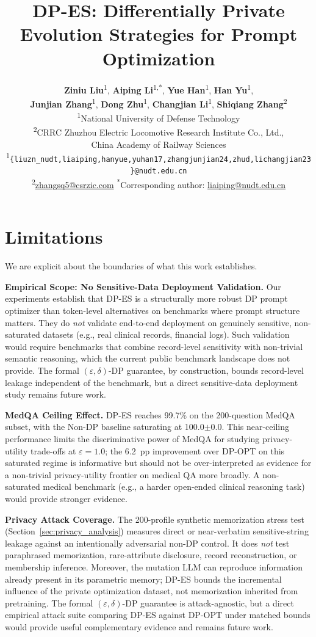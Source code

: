 \documentclass[11pt]{article}
\title{DP-ES: Differentially Private Evolution Strategies for Prompt Optimization}
\author{
\textbf{Ziniu Liu}\textsuperscript{1},
\textbf{Aiping Li}\textsuperscript{1,*},
\textbf{Yue Han}\textsuperscript{1},
\textbf{Han Yu}\textsuperscript{1},\\
\textbf{Junjian Zhang}\textsuperscript{1},
\textbf{Dong Zhu}\textsuperscript{1},
\textbf{Changjian Li}\textsuperscript{1},
\textbf{Shiqiang Zhang}\textsuperscript{2}\\
\textsuperscript{1}National University of Defense Technology\\
\textsuperscript{2}CRRC Zhuzhou Electric Locomotive Research Institute Co., Ltd.,\\
China Academy of Railway Sciences\\
{\small\textsuperscript{1}\texttt{\{liuzn\_nudt,liaiping,hanyue,yuhan17,zhangjunjian24,zhud,lichangjian23\}@nudt.edu.cn}}\\[-0.2em]
{\small\textsuperscript{2}\href{mailto:zhangsq5@csrzic.com}{zhangsq5@csrzic.com}\quad
\textsuperscript{*}Corresponding author: \href{mailto:liaiping@nudt.edu.cn}{liaiping@nudt.edu.cn}}
}
\begin{document}
\maketitle

















\section*{Limitations}

We are explicit about the boundaries of what this work establishes.

\noindent \textbf{Empirical Scope: No Sensitive-Data Deployment Validation.}
Our experiments establish that DP-ES is a structurally more robust DP prompt optimizer than token-level alternatives on benchmarks where prompt structure matters. They do \textit{not} validate end-to-end deployment on genuinely sensitive, non-saturated datasets (e.g., real clinical records, financial logs). Such validation would require benchmarks that combine record-level sensitivity with non-trivial semantic reasoning, which the current public benchmark landscape does not provide. The formal $(\varepsilon,\delta)$-DP guarantee, by construction, bounds record-level leakage independent of the benchmark, but a direct sensitive-data deployment study remains future work.

\noindent \textbf{MedQA Ceiling Effect.}
DP-ES reaches 99.7\% on the 200-question MedQA subset, with the Non-DP baseline saturating at 100.0$\pm$0.0. This near-ceiling performance limits the discriminative power of MedQA for studying privacy-utility trade-offs at $\varepsilon{=}1.0$; the 6.2~pp improvement over DP-OPT on this saturated regime is informative but should not be over-interpreted as evidence for a non-trivial privacy-utility frontier on medical QA more broadly. A non-saturated medical benchmark (e.g., a harder open-ended clinical reasoning task) would provide stronger evidence.

\noindent \textbf{Privacy Attack Coverage.}
The 200-profile synthetic memorization stress test (Section~\ref{sec:privacy_analysis}) measures direct or near-verbatim sensitive-string leakage against an intentionally adversarial non-DP control. It does \textit{not} test paraphrased memorization, rare-attribute disclosure, record reconstruction, or membership inference. Moreover, the mutation LLM can reproduce information already present in its parametric memory; DP-ES bounds the incremental influence of the private optimization dataset, not memorization inherited from pretraining. The formal $(\varepsilon,\delta)$-DP guarantee is attack-agnostic, but a direct empirical attack suite comparing DP-ES against DP-OPT under matched bounds would provide useful complementary evidence and remains future work.
\end{document}
